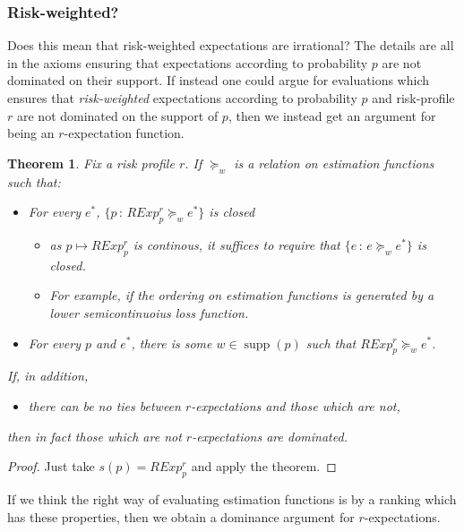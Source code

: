 \documentclass[11pt]{article}
\newtheorem{theorem}{Theorem}[section]
\theoremstyle{definition}
\theoremstyle{remark}
\newcommand{\supp}{\operatorname{supp}}
\newcommand{\given}{\,:\,}
\begin{document}
\subsubsection{Risk-weighted?}

Does this mean that risk-weighted expectations are irrational?
The details are all in the axioms ensuring that expectations according to probability $p$ are not dominated on their support. 
If instead one could argue for evaluations which ensures that \emph{risk-weighted} expectations according to probability $p$ and risk-profile $r$ are not dominated on the support of $p$, then we instead get an argument for being an $r$-expectation function. 

\begin{theorem}Fix a risk profile $r$. 
	If $\succeq_w$ is a relation on estimation functions such that:
	\begin{itemize}
		\item For every $e^*$,  $\{p \given RExp_p^r\succeq_w e^*\}$ is closed
		\begin{itemize}
			\item as $p\mapsto RExp_p^r$ is continous, it suffices to require that $\{e\given e\succeq_w e^*\}$ is closed. 
			\item For example, if the ordering on estimation functions is generated by a lower semicontinuoius loss function. 
		\end{itemize}
		\item For every $p$ and $e^*$, there is some $w\in\supp(p)$ such that $RExp_p^r\succeq_w e^*$. 
	\end{itemize}
	If, in addition, 
	\begin{itemize}
		\item there can be no ties between $r$-expectations and those which are not,
	\end{itemize} then in fact those which are not $r$-expectations are dominated. 
\end{theorem}
\begin{proof}
	Just take $s(p)=RExp_p^r$ and apply the theorem. 
\end{proof}

If we think the right way of evaluating estimation functions is by a ranking which has these properties, then we obtain a dominance argument for $r$-expectations. 
\end{document}

